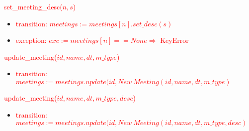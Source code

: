 \documentclass[12pt, titlepage]{article}
\begin{document}
\noindent \textcolor{red}{set\_meeting\_desc($n,s$)}
\begin{itemize}
    \item \textcolor{red}{transition: $meetings := meetings[n].set\_desc(s)$}
    \item \textcolor{red}{exception: $exc := meetings[n] == None \Rightarrow$ KeyError}
\end{itemize}

\noindent \textcolor{red}{update\_meeting($id, name, dt, m\_type$)}
\begin{itemize}
    \item \textcolor{red}{transition: $meetings := meetings.update(id, New \ Meeting(id, name, dt, m\_type)$}
\end{itemize}

\noindent \textcolor{red}{update\_meeting($id, name, dt, m\_type, desc$)}
\begin{itemize}
    \item \textcolor{red}{transition: $meetings := meetings.update(id, New \ Meeting(id, name, dt, m\_type, desc)$}
\end{itemize}
\end{document}
